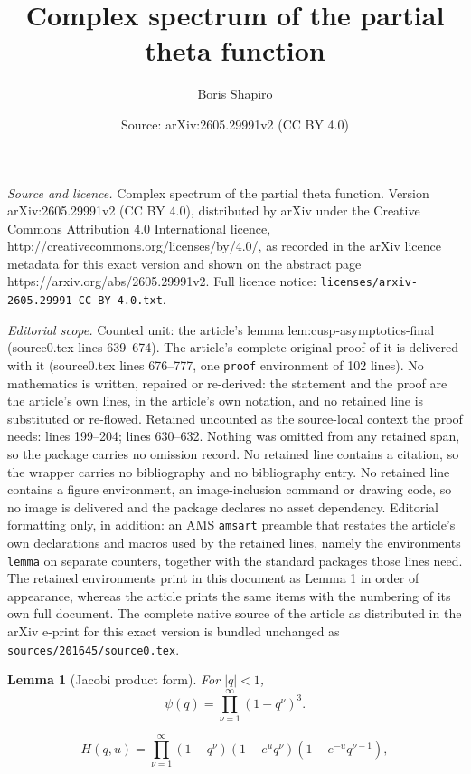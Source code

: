 \documentclass[10pt,a4paper]{amsart}
\title{Complex spectrum of the partial theta function}
\author{Boris Shapiro}
\date{Source: arXiv:2605.29991v2 (CC BY 4.0)}
\newtheorem{lemma}{Lemma}
\begin{document}
\maketitle

\noindent\emph{Source and licence.} Complex spectrum of the partial theta function. Version arXiv:2605.29991v2 (CC BY 4.0), distributed by arXiv under the Creative Commons Attribution 4.0 International licence, http://creativecommons.org/licenses/by/4.0/, as recorded in the arXiv licence metadata for this exact version and shown on the abstract page https://arxiv.org/abs/2605.29991v2. Full licence notice: \texttt{licenses/arxiv-2605.29991-CC-BY-4.0.txt}.\par\smallskip

\noindent\textit{Editorial scope.} Counted unit: the article's lemma lem:cusp-asymptotics-final (source0.tex lines 639--674). The article's complete original proof of it is delivered with it (source0.tex lines 676--777, one \texttt{proof} environment of 102 lines). No mathematics is written, repaired or re-derived: the statement and the proof are the article's own lines, in the article's own notation, and no retained line is substituted or re-flowed.  Retained uncounted as the source-local context the proof needs: lines 199--204; lines 630--632.  Nothing was omitted from any retained span, so the package carries no omission record.  No retained line contains a citation, so the wrapper carries no bibliography and no bibliography entry.  No retained line contains a figure environment, an image-inclusion command or drawing code, so no image is delivered and the package declares no asset dependency.  Editorial formatting only, in addition: an AMS \texttt{amsart} preamble that restates the article's own declarations and macros used by the retained lines, namely the environments \texttt{lemma} on separate counters, together with the standard packages those lines need.  The retained environments print in this document as Lemma 1 in order of appearance, whereas the article prints the same items with the numbering of its own full document.  The complete native source of the article as distributed in the arXiv e-print for this exact version is bundled unchanged as \texttt{sources/201645/source0.tex}.
\begin{lemma}[Jacobi product form]\label{lem:eta-cubed}
For \(|q|<1\),
\[
        \psi(q)=\prod_{\nu=1}^{\infty}(1-q^\nu)^3.
\]
\end{lemma}

\begin{equation}\label{eq:H-product-final}
        H(q,u)=\prod_{\nu=1}^{\infty}(1-q^\nu)(1-e^uq^\nu)(1-e^{-u}q^{\nu-1}),
\end{equation}
\end{document}
